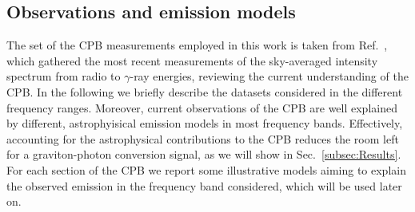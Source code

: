 \documentclass[twocolumn,superscriptaddress,floatfix,preprintnumbers, nofootinbib,hyperref]{revtex4-2}
\begin{document}
\subsection{Observations and emission models}
\label{subsec:CPB}
The set of the CPB measurements employed in this work is taken from Ref.~\cite{Hill:2018trh}, which gathered the most recent measurements of the sky-averaged intensity spectrum from radio to $\gamma$-ray energies, reviewing the current understanding of the CPB. In the following we briefly describe the datasets considered in the different frequency ranges. Moreover, current observations of the CPB are well explained by different, astrophyisical emission models in most frequency bands. Effectively, accounting for the astrophysical contributions to the CPB reduces the room left for a graviton-photon conversion signal, as we will show in Sec.~\ref{subsec:Results}.
For each section of the CPB we report some illustrative models aiming to explain the observed emission in the frequency band considered, which will be used later on.
\end{document}

